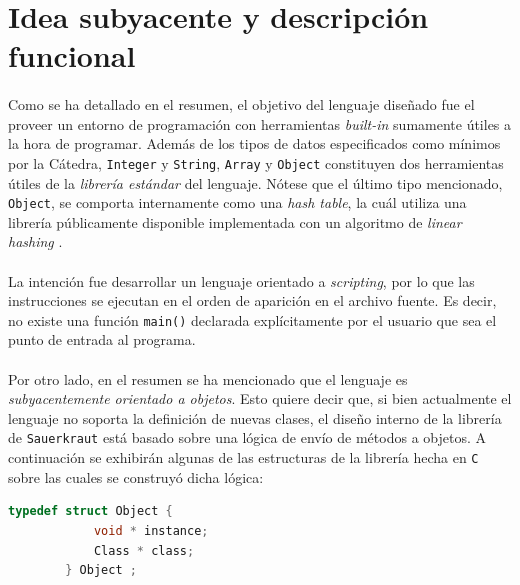 \documentclass[12pt]{article}
\begin{document}
	\newpage


	\section{Idea subyacente y descripción funcional}
	
	\paragraph{} Como se ha detallado en el resumen, el objetivo del lenguaje diseñado fue el proveer un entorno de programación con herramientas \textit{built-in} sumamente útiles a la hora de programar. Además de los tipos de datos especificados como mínimos por la Cátedra, \verb|Integer| y \verb|String|, \verb|Array| y \verb|Object| constituyen dos herramientas útiles de la \textit{librería estándar} del lenguaje. Nótese que el último tipo mencionado, \verb|Object|, se comporta internamente como una \textit{hash table}, la cuál utiliza una librería públicamente disponible implementada con un algoritmo de \textit{linear hashing} \cite{linear_hash}.  
	
	\paragraph{} La intención fue desarrollar un lenguaje orientado a \textit{scripting}, por lo que las instrucciones se ejecutan en el orden de aparición en el archivo fuente. Es decir, no existe una función \verb|main()| declarada explícitamente por el usuario que sea el punto de entrada al programa. 
	
	\paragraph{} Por otro lado, en el resumen se ha mencionado que el lenguaje es \textit{subyacentemente orientado a objetos}. Esto quiere decir que, si bien actualmente el lenguaje no soporta la definición de nuevas clases, el diseño interno de la librería de \verb|Sauerkraut| está basado sobre una lógica de envío de métodos a objetos. A continuación se exhibirán algunas de las estructuras de la librería hecha en \verb|C| sobre las cuales se construyó dicha lógica:

	\begin{center}
		\begin{lstlisting}[language=C]
		typedef struct Object {
			void * instance;
			Class * class;
		} Object ;
		\end{lstlisting}
	\end{center}
	
\end{document}
